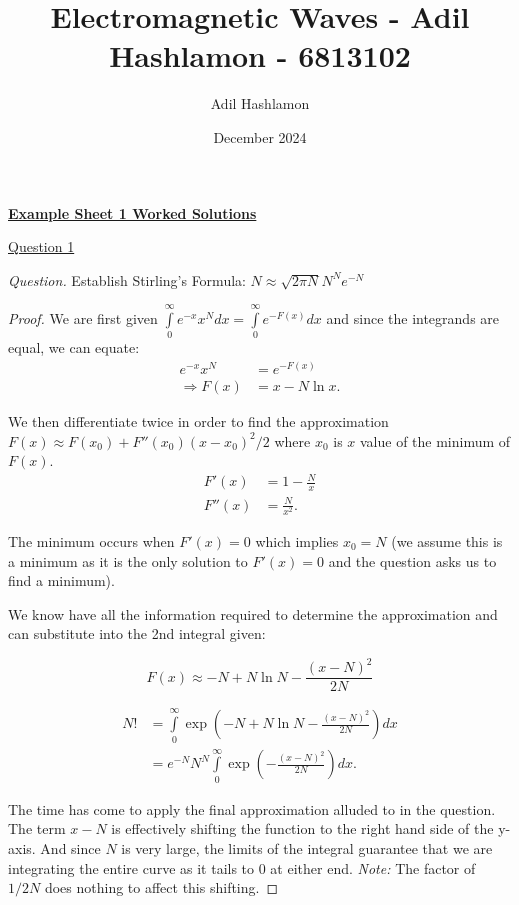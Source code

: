 \documentclass[11pt]{article}
\title{Electromagnetic Waves - Adil Hashlamon - 6813102}
\author{Adil Hashlamon}
\date{December 2024}
\begin{document}
\underline{\textbf{Example Sheet 1 Worked Solutions}}

\underline{Question 1}

\textit{Question.} Establish Stirling's Formula: $N \approx \sqrt{2\pi N }N^N e^{-N}$

\begin{proof}
We are first given $\int\limits_{0}^{\infty}e^{-x} x^N dx = \int\limits_{0}^{\infty}e^{-F(x)} dx$ and since the integrands are equal, we can equate:
\begin{equation}
    \begin{aligned}
        e^{-x}x^N &= e^{-F(x)} \\
        \Rightarrow F(x) &= x - N\ln x.
    \end{aligned}
\end{equation}

We then differentiate twice in order to find the approximation $F(x) \approx F(x_0) + F''(x_0) (x-x_0)^2/2$ where $x_0$ is $x$ value of the minimum of $F(x)$.
\begin{equation}
    \begin{aligned}
        F'(x) &= 1- \frac{N}{x} \\
        F''(x) &= \frac{N}{x^2}.
    \end{aligned}
\end{equation}

The minimum occurs when $F'(x)=0$ which implies $x_0 = N$ (we assume this is a minimum as it is the only solution to $F'(x)=0$ and the question asks us to find a minimum).

We know have all the information required to determine the approximation and can substitute into the 2nd integral given:

\begin{equation}
    F(x) \approx -N + N \ln  N - \frac{(x-N)^2}{2N}
\end{equation}

\begin{equation}
    \begin{aligned}
        N! &= \int\limits_{0}^{\infty} \exp\left(-N + N \ln  N - \frac{(x-N)^2}{2N}\right) dx \\
        & = e^{-N} N^N \int\limits_{0}^{\infty} \exp\left( - \frac{(x-N)^2}{2N}\right) dx.
    \end{aligned}
\end{equation}

The time has come to apply the final approximation alluded to in the question. The term $x-N$ is effectively shifting the function to the right hand side of the y-axis. And since $N$ is very large, the limits of the integral guarantee that we are integrating the entire curve as it tails to $0$ at either end. \textit{Note: }The factor of $1/2N$ does nothing to affect this shifting.


\end{proof}
\end{document}
